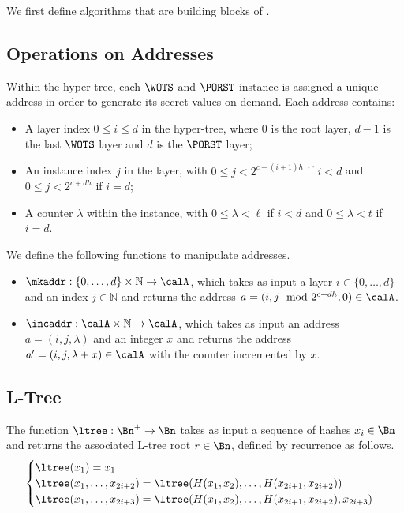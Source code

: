 We first define algorithms that are building blocks of \gravity{}.

\subsection{Operations on Addresses}

Within the hyper-tree, each $\WOTS$ and $\PORST$ instance is assigned a unique address in order to generate its secret values on demand.
Each address contains:
\begin{itemize}
\item A layer index $0 \le i \le d$ in the hyper-tree, where $0$ is the root layer, $d-1$ is the last $\WOTS$ layer and $d$ is the $\PORST$ layer;
\item An instance index $j$ in the layer, with $0 \le j < 2^{c+(i+1)h}$ if $i < d$ and $0 \le j < 2^{c+dh}$ if $i = d$;
\item A counter $\lambda$ within the instance, with $0 \le \lambda < \ell$ if $i < d$ and $0 \le \lambda < t$ if $i = d$.
\end{itemize}
%
We define the following functions to manipulate addresses.
\begin{itemize}
\item $\mkaddr : \{0, \ldots, d\} \times \mathbb{N} \to \calA$, which takes as input a layer $i \in \{0, \ldots, d\}$ and an index $j \in \mathbb{N}$ and returns the address $a = (i, j \mod 2^{c+dh}, 0) \in \calA$.
\item $\incaddr : \calA \times \mathbb{N} \to \calA$, which takes as input an address $a = (i, j, \lambda)$ and an integer $x$ and returns the address $a' = (i, j, \lambda+x) \in \calA$ with the counter incremented by $x$.
\end{itemize}

\subsection{L-Tree}

The function $\ltree : \Bn^+ \to \Bn$ takes as input a sequence of hashes $x_i \in \Bn$ and returns the associated L-tree root $r \in \Bn$, defined by recurrence as follows.
\[\begin{cases}
\ltree(x_1) = x_1 \\
\ltree(x_1, \ldots, x_{2i+2}) = \ltree(H(x_1, x_2), \ldots, H(x_{2i+1}, x_{2i+2})) \\
\ltree(x_1, \ldots, x_{2i+3}) = \ltree(H(x_1, x_2), \ldots, H(x_{2i+1}, x_{2i+2}), x_{2i+3})
\end{cases}
\]

